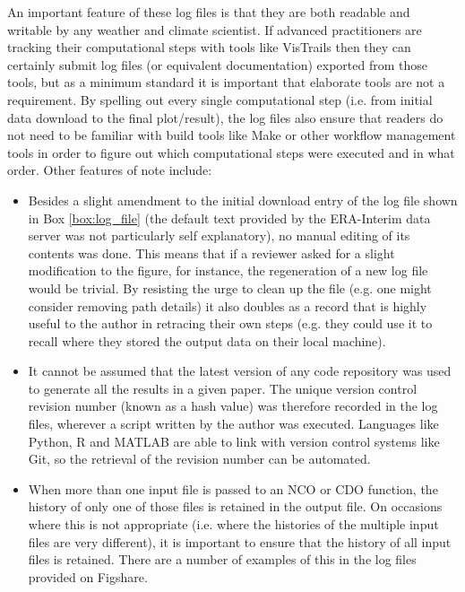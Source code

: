 An important feature of these log files is that they are both readable and writable by any weather and climate scientist. If advanced practitioners are tracking their computational steps with tools like VisTrails then they can certainly submit log files (or equivalent documentation) exported from those tools, but as a minimum standard it is important that elaborate tools are not a requirement. By spelling out every single computational step (i.e. from initial data download to the final plot/result), the log files also ensure that readers do not need to be familiar with build tools like Make or other workflow management tools in order to figure out which computational steps were executed and in what order. Other features of note include:
\begin{itemize}
\item Besides a slight amendment to the initial download entry of the log file shown in Box \ref{box:log_file} (the default text provided by the ERA-Interim data server was not particularly self explanatory), no manual editing of its contents was done. This means that if a reviewer asked for a slight modification to the figure, for instance, the regeneration of a new log file would be trivial. By resisting the urge to clean up the file (e.g. one might consider removing path details) it also doubles as a record that is highly useful to the author in retracing their own steps (e.g. they could use it to recall where they stored the output data on their local machine).
\item It cannot be assumed that the latest version of any code repository was used to generate all the results in a given paper. The unique version control revision number (known as a hash value) was therefore recorded in the log files, wherever a script written by the author was executed. Languages like Python, R and MATLAB are able to link with version control systems like Git, so the retrieval of the revision number can be automated.
\item When more than one input file is passed to an NCO or CDO function, the history of only one of those files is retained in the output file. On occasions where this is not appropriate (i.e. where the histories of the multiple input files are very different), it is important to ensure that the history of all input files is retained. There are a number of examples of this in the log files provided on Figshare. 
\end{itemize}
  
